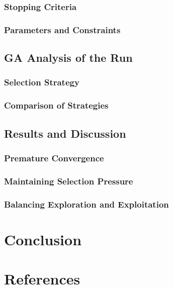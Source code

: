 \documentclass[conference]{inc/IEEEtran}
\begin{document}
\subsubsection{Stopping Criteria}

\subsubsection{Parameters and Constraints}
\subsection{GA Analysis of the Run}

\subsubsection{Selection Strategy}

\subsubsection{Comparison of Strategies}
\subsection{Results and Discussion}

\subsubsection{Premature Convergence}

\subsubsection{Maintaining Selection Pressure}

\subsubsection{Balancing Exploration and Exploitation}

\section{Conclusion}

\section*{References}




\end{document}

